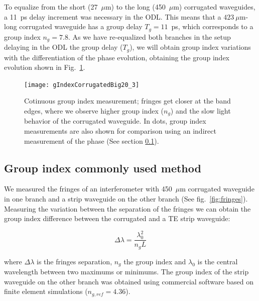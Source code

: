 \documentclass[journal]{IEEEtran}
\begin{document}
To equalize from the short (27~$\mu$m) to the long (450~$\mu$m) corrugated waveguides, a 11~ps delay increment was necessary in the ODL. This means that a $423~\mu$m-long corrugated waveguide has a group delay $T_g=11$~ps, which corresponds to a group index $n_g=7.8$.  As we have re-equalized  both branches in the setup delaying in the ODL the group delay ($T_g$), we will obtain group index variations with the differentiation of the phase evolution, obtaining the group index evolution shown in Fig.~\ref{fig:groupIndex}.




\begin{figure}[htb]
\centering
\texttt{[image: gIndexCorrugatedBig20\_3]}
\caption{Cotinuous group index measurement; fringes get closer at the band edges, where we observe higher group index ($n_g$) and the slow light behavior of the corrugated waveguide. In dots, group index measurements are also shown for comparison using an indirect measurement of the phase (See section \ref{sec:oldTechnique}).}
\label{fig:groupIndex}
\end{figure}



\subsection{Group index commonly used method}
\label{sec:oldTechnique}
We measured the fringes of an interferometer with 450~$\mu$m corrugated waveguide in one branch and a strip waveguide on the other branch (See fig.~\ref{fig:fringes}). Measuring the variation between the separation of the fringes we can obtain the group index difference between the corrugated and a TE strip waveguide:

\begin{equation}
	\Delta\lambda=\frac{\lambda_0^2}{n_g L}
\end{equation}


where $\Delta\lambda$ is the fringes separation, $n_g$ the group index and $\lambda_0$ is the central wavelength between two maximums or minimums. The group index of the strip waveguide on the other branch was obtained using commercial software based on finite element simulations ($n_{g,ref}=4.36$). 

\end{document}
